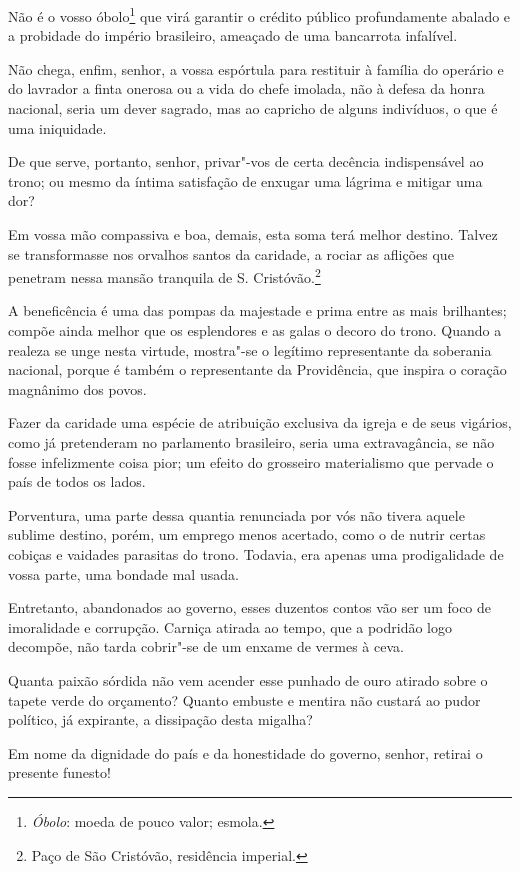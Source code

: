 \begin{linenumbers}
Não é o vosso óbolo\footnote{ \textit{Óbolo}: moeda de pouco valor; esmola.}
 que virá garantir o crédito público profundamente abalado e a probidade
do império brasileiro, ameaçado de uma bancarrota infalível. 

 Não chega, enfim, senhor, a vossa espórtula para restituir à família do
operário e do lavrador a finta onerosa ou a vida do chefe imolada, não
à defesa da honra nacional, seria um dever sagrado, mas ao capricho de
alguns indivíduos, o que é uma iniquidade. 

 De que serve, portanto, senhor, privar"-vos de certa decência
indispensável ao trono; ou mesmo da íntima satisfação de enxugar uma
lágrima e mitigar uma dor? 

 Em vossa mão compassiva e boa, demais, esta soma terá melhor destino.
Talvez se transformasse nos orvalhos santos da caridade, a rociar as
aflições que penetram nessa mansão tranquila de S.
Cristóvão.\footnote{ Paço de São Cristóvão, residência imperial.}
 

 A beneficência é uma das pompas da majestade e prima entre as mais
brilhantes; compõe ainda melhor que os esplendores e as galas o decoro
do trono. Quando a realeza se unge nesta virtude, mostra"-se o
legítimo representante da soberania nacional, porque é também o
representante da Providência, que inspira o coração magnânimo dos povos. 

 Fazer da caridade uma espécie de atribuição exclusiva da igreja e de
seus vigários, como já pretenderam no parlamento brasileiro, seria uma
extravagância, se não fosse infelizmente coisa pior; um efeito do
grosseiro materialismo que pervade o país de todos os lados.

 Porventura, uma parte dessa quantia renunciada por vós não tivera
aquele sublime destino, porém, um emprego menos acertado, como o de
nutrir certas cobiças e vaidades parasitas do trono. Todavia, era
apenas uma prodigalidade de vossa parte, uma bondade mal usada. 

 Entretanto, abandonados ao governo, esses duzentos contos vão ser um
foco de imoralidade e corrupção. Carniça atirada ao tempo, que a
podridão logo decompõe, não tarda cobrir"-se de um enxame de vermes à ceva.

 Quanta paixão sórdida não vem acender esse punhado de ouro atirado
sobre o tapete verde do orçamento? Quanto embuste e mentira não custará
ao pudor político, já expirante, a dissipação desta migalha?

 Em nome da dignidade do país e da honestidade do governo, senhor,
retirai o presente funesto!


\end{linenumbers}
